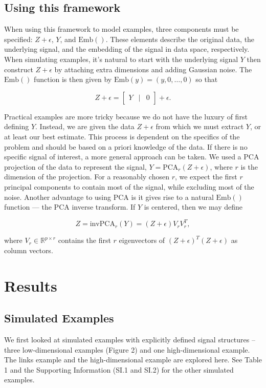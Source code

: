 \documentclass{article}
\begin{document}
\subsection{Using this framework}
When using this framework to model examples, three components must be specified: $Z + \epsilon$, $Y$, and $\textrm{Emb}()$. These elements describe the original data, the underlying signal, and the embedding of the signal in data space, respectively. When simulating examples, it's natural to start with the underlying signal $Y$ then construct $Z + \epsilon$ by attaching extra dimensions and adding Gaussian noise. The $\textrm{Emb}()$ function is then given by $\textrm{Emb}(y) = (y,0,\hdots,0)$ so that
\begin{linenomath}$$Z + \epsilon = \begin{bmatrix}
Y & \vert & 0
\end{bmatrix} + \epsilon.$$\end{linenomath}

Practical examples are more tricky because we do not have the luxury of first defining $Y$. Instead, we are given the data $Z + \epsilon$ from which we must extract $Y$, or at least our best estimate. This process is dependent on the specifics of the problem and should be based on a priori knowledge of the data. If there is no specific signal of interest, a more general approach can be taken. We used a PCA projection of the data to represent the signal, $Y = \textrm{PCA}_r(Z + \epsilon)$, where $r$ is the dimension of the projection. For a reasonably chosen $r$, we expect the first $r$ principal components to contain most of the signal, while excluding most of the noise. Another advantage to using PCA is it gives rise to a natural $\textrm{Emb}()$ function --- the PCA inverse transform. If $Y$ is centered, then we may define \begin{linenomath}$$Z = \textrm{invPCA}_r(Y) = (Z + \epsilon)V_rV_r^T,$$\end{linenomath} where $V_r \in \mathbb{R}^{p \times r}$ contains the first $r$ eigenvectors of $(Z+\epsilon)^T(Z+\epsilon)$ as column vectors.

\section{Results}

\subsection{Simulated Examples}
We first looked at simulated examples with explicitly defined signal structures -- three low-dimensional examples (Figure 2) and one high-dimensional example. The links example and the high-dimensional example are explored here. See Table 1 and the Supporting Information (SI.1 and SI.2) for the other simulated examples.
\end{document}
